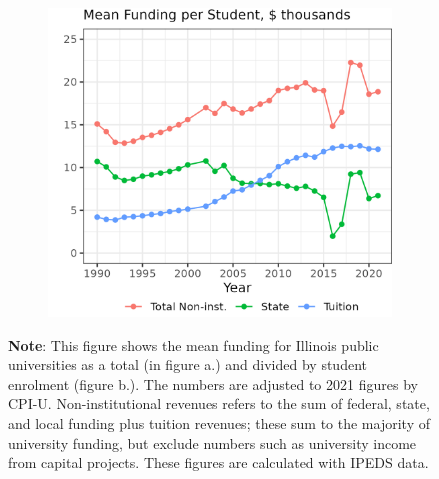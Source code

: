 \begin{figure}[H]
\begin{subfigure}[b]{0.495\textwidth}
        \includegraphics[width=\textwidth]{figures/illinois-funding-fte.png}
        \label{fig:illinois-funding-fte}
    \end{subfigure}
    \label{fig:illinois-funding}
    \vspace{-1cm}
    \justify
    \footnotesize
    \textbf{Note}:       
    This figure shows the mean funding for Illinois public universities as a total (in figure a.) and divided by student enrolment (figure b.).
    The numbers are adjusted to 2021 figures by CPI-U.
    Non-institutional revenues refers to the sum of federal, state, and local funding plus tuition revenues; these sum to the majority of university funding, but exclude numbers such as university income from capital projects.
    These figures are calculated with IPEDS data.
\end{figure}

